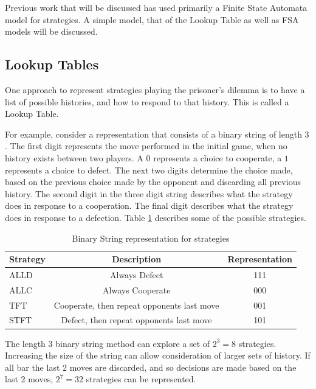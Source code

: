 \documentclass[a4paper,11pt,bcshonoursthesis,singlespace,twoside,thesisdraft,pdflatex]{cssethesis}
\begin{document}
Previous work that will be discussed has used primarily a Finite State Automata model for strategies. 
A simple model, that of the Lookup Table as well as FSA models will be discussed.
\subsection{Lookup Tables}
One approach to represent strategies playing the prisoner's dilemma is to have a list of possible histories, and how to respond to that history. This is called a Lookup Table. 

For example, consider a representation that consists of a binary string of length 3 \citep{garcia:PLoSOne:2012}. 
The first digit represents the move performed in the initial game, when no history exists between two players. 
A $0$ represents a choice to cooperate, a $1$ represents a choice to defect. 
The next two digits determine the choice made, based on the previous choice made by the opponent and discarding all previous history. 
The second digit in the three digit string describes what the strategy does in response to a cooperation. 
The final digit describes what the strategy does in response to a defection. 
Table \ref{table:binaryStrategy} describes some of the possible strategies.

\begin{table}[h]
\centering
\captionsetup{justification=centering}
\begin{tabular}{|l|c|c|}
\hline
 Strategy & Description & Representation\\
\hline
ALLD & Always Defect & 111\\
\hline
ALLC & Always Cooperate & 000\\
\hline
TFT & Cooperate, then repeat opponents last move & 001\\
\hline
STFT & Defect, then repeat opponents last move & 101\\
\hline
\end{tabular}
\caption{Binary String representation for strategies}
\label{table:binaryStrategy}
\end{table}

The length 3 binary string method can explore a set of $2^3=8$ strategies. Increasing the size of the string can allow consideration of larger sets of history. 
If all bar the last 2 moves are discarded, and so decisions are made based on the last 2 moves, $2^7=32$ strategies can be represented. 
\end{document}
